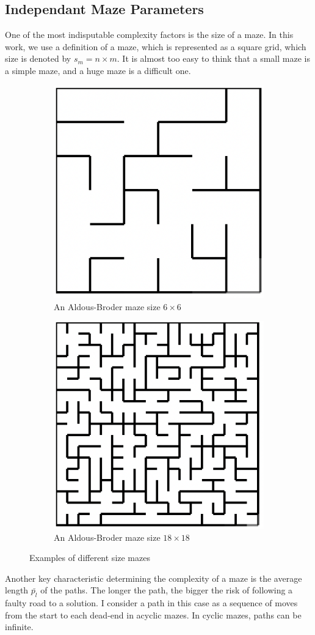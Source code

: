 \subsection{Independant Maze Parameters}
\begin{description}[style=unboxed]
\item[Size] One of the most indisputable complexity factors is the size of a maze. In this work, we use a definition of a maze, which is represented as a square grid, which size is denoted by $s_m = n \times m$. It is almost too easy to think that a small maze is a simple maze, and a huge maze is a difficult one.
\begin{figure}[!h]
    \centering
    \begin{subfigure}{.5\textwidth}
    \centering
    \includegraphics[width=.5\linewidth]{66}
    \caption{An Aldous-Broder maze size $6 \times 6$}
\label{fig:sub1}
    \end{subfigure}%
    \begin{subfigure}{.5\textwidth}
    \centering
    \includegraphics[width=.5\linewidth]{1818}
    \caption{An Aldous-Broder maze size $18 \times 18$}
\label{fig:sub2}
    \end{subfigure}
    \caption{Examples of different size mazes}
\label{fig:test}
\end{figure}
\item[Path length] Another key characteristic determining the complexity of a maze is the average length $\bar{p_l}$ of the paths. The longer the path, the bigger the risk of following a faulty road to a solution. I consider a path in this case as a sequence of moves from the start to each dead-end in acyclic mazes. In cyclic mazes, paths can be infinite.
\newline


\end{description}
